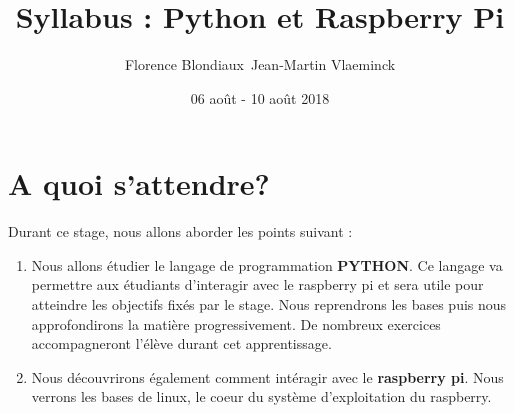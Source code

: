 \documentclass[12pt,a4paper,oneside]{report}
\title{Syllabus : Python et Raspberry Pi}
\author{Florence Blondiaux\
       Jean-Martin Vlaeminck}
\date{06 août - 10 août 2018}
\begin{document}
\maketitle
\tableofcontents


\chapter{A quoi s'attendre?}

\vspace*{3cm}

Durant ce stage, nous allons aborder les points suivant :


\begin{minipage}[l]{0.70\textwidth}
	\begin{enumerate}
		\item Nous allons étudier le langage de programmation \textbf{PYTHON}. Ce langage va permettre aux étudiants d'interagir avec le raspberry pi et sera utile pour atteindre les objectifs fixés par le stage. Nous reprendrons les bases puis nous approfondirons la matière progressivement. De nombreux exercices accompagneront l'élève durant cet apprentissage.\\
		
		\item Nous découvrirons également comment intéragir avec le \textbf{raspberry pi}. Nous verrons les bases de linux, le coeur du système d'exploitation du raspberry. 
		
	\end{enumerate}
\end{minipage}
\hfill
\end{document}
